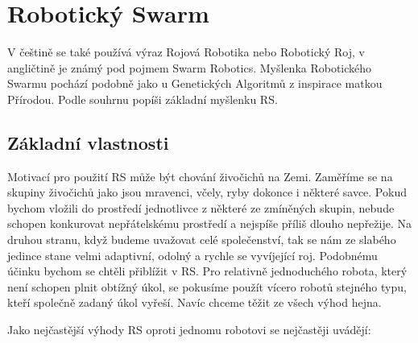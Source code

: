 
\chapter{Robotický Swarm}
V češtině se také používá výraz Rojová Robotika nebo Robotický Roj, v angličtině je známý pod pojmem Swarm Robotics. Myšlenka Robotického Swarmu pochází podobně jako u Genetických Algoritmů z inspirace matkou Přírodou. Podle souhrnu \citep{swarmRobotic} popíši základní myšlenku RS.
\section{Základní vlastnosti}
Motivací pro použití RS může být chování živočichů na Zemi. Zaměříme se na skupiny živočichů jako jsou mravenci, včely, ryby dokonce i některé savce. Pokud bychom vložili do prostředí jednotlivce z některé ze zmíněných skupin, nebude schopen konkurovat nepřátelskému prostředí a nejspíše příliš dlouho nepřežije. Na druhou stranu, když budeme uvažovat celé společenství, tak se nám ze slabého jedince stane velmi adaptivní, odolný a rychle se vyvíjející roj. Podobnému účinku bychom se chtěli přiblížit v RS. Pro relativně jednoduchého robota, který není schopen plnit obtížný úkol, se pokusíme použít vícero robotů stejného typu, kteří společně zadaný úkol vyřeší. Navíc chceme těžit ze všech výhod hejna. \par
Jako nejčastější výhody RS oproti jednomu robotovi se nejčastěji uvádějí:

